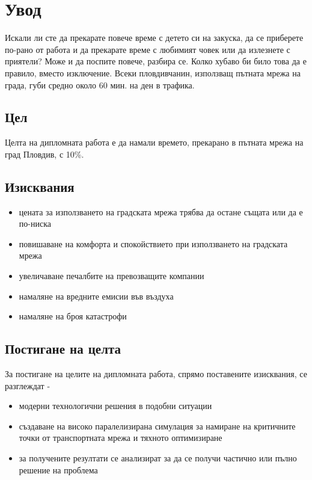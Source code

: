 \chapter{Увод}

Искали ли сте да прекарате повече време с детето си на закуска, да се приберете по-рано от работа и да прекарате време с любимият човек или да излезнете с приятели? Може и да поспите повече, разбира се. Колко хубаво би било това да е правило, вместо изключение.
Всеки пловдивчанин, използващ пътната мрежа на града, губи средно около 60 мин. на ден в трафика. 

\section{Цел}

Целта на дипломната работа е да намали времето, прекарано в пътната мрежа на град Пловдив, с 10\%. 

\section{Изисквания}

\begin{itemize}
\item цената за използването на градската мрежа трябва да остане същата или да е по-ниска
\item повишаване на комфорта и спокойствието при използването на градската мрежа
\item увеличаване печалбите на превозващите компании
\item намаляне на вредните емисии във въздуха
\item намаляне на броя катастрофи
\end{itemize}

\section{Постигане на целта}

За постигане на целите на дипломната работа, спрямо поставените изисквания, се разглеждат - 

\begin{itemize}
\item модерни технологични решения в подобни ситуации
\item създаване на високо паралелизирана симулация за намиране на критичните точки от транспортната мрежа и тяхното оптимизиране
\item за получените резултати се анализират за да се получи частично или пълно решение на проблема
\end{itemize}

